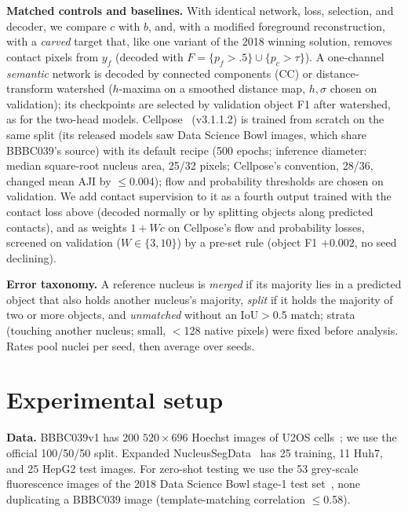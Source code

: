 \documentclass{article}
\begin{document}
\textbf{Matched controls and baselines.} With identical network, loss, selection, and decoder, we compare $c$ with $b$, and, with a modified foreground reconstruction, with a \emph{carved} target that, like one variant of the 2018 winning solution, removes contact pixels from $y_f$ (decoded with $F=\{p_f>.5\}\cup\{p_c>\tau\}$). A one-channel \emph{semantic} network is decoded by connected components (CC) or distance-transform watershed ($h$-maxima on a smoothed distance map, $h,\sigma$ chosen on validation); its checkpoints are selected by validation object F1 after watershed, as for the two-head models. Cellpose~\cite{stringer2021cellpose} (v3.1.1.2) is trained from scratch on the same split (its released models saw Data Science Bowl images, which share BBBC039's source) with its default recipe (500 epochs; inference diameter: median square-root nucleus area, 25/32 pixels; Cellpose's convention, 28/36, changed mean AJI by $\le$0.004); flow and probability thresholds are chosen on validation. We add contact supervision to it as a fourth output trained with the contact loss above (decoded normally or by splitting objects along predicted contacts), and as weights $1+Wc$ on Cellpose's flow and probability losses, screened on validation ($W\in\{3,10\}$) by a pre-set rule (object F1 $+0.002$, no seed declining).

\textbf{Error taxonomy.} A reference nucleus is \emph{merged} if its majority lies in a predicted object that also holds another nucleus's majority, \emph{split} if it holds the majority of two or more objects, and \emph{unmatched} without an IoU$>$0.5 match; strata (touching another nucleus; small, $<$128 native pixels) were fixed before analysis. Rates pool nuclei per seed, then average over seeds.

\section{Experimental setup}
\textbf{Data.} BBBC039v1 has 200 $520\!\times\!696$ Hoechst images of U2OS cells~\cite{ljosa2012annotated,caicedo2019nucleus}; we use the official 100/50/50 split. Expanded NucleusSegData~\cite{gunesli2020attentionboost,koyuncu2018object} has 25 training, 11 Huh7, and 25 HepG2 test images. For zero-shot testing we use the 53 grey-scale fluorescence images of the 2018 Data Science Bowl stage-1 test set~\cite{caicedo2019nucleus}, none duplicating a BBBC039 image (template-matching correlation $\le$0.58).
\end{document}
